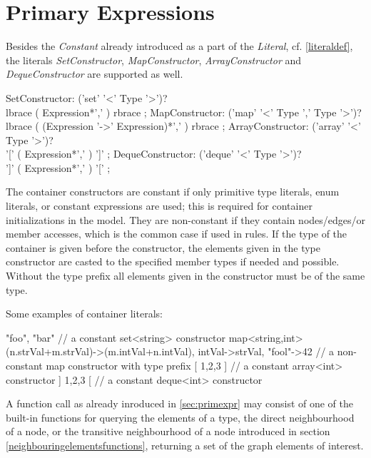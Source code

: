 \section{Primary Expressions}\label{sec:containerprimexpr}

Besides the \emph{Constant} already introduced as a part of the \emph{Literal}, cf. \ref{literaldef}, the literals \emph{SetConstructor}, \emph{MapConstructor}, \emph{ArrayConstructor} and \emph{DequeConstructor} are supported as well.

\begin{rail}
  SetConstructor: ('set' '<' Type '>')? \\ lbrace ( Expression*',' ) rbrace ;
  MapConstructor: ('map' '<' Type ',' Type '>')? \\ lbrace ( (Expression '->' Expression)*',' ) rbrace ;
  ArrayConstructor: ('array' '<' Type '>')? \\ '[' ( Expression*',' ) ']' ;
  DequeConstructor: ('deque' '<' Type '>')? \\ ']' ( Expression*',' ) '[' ;
\end{rail}

The container constructors are constant if only primitive type literals, enum literals, or constant expressions are used; this is required for container initializations in the model.
They are non-constant if they contain nodes/edges/or member accesses, which is the common case if used in rules.
If the type of the container is given before the constructor, the elements given in the type constructor are casted to the specified member types if needed and possible.
Without the type prefix all elements given in the constructor must be of the same type.

\begin{example}
Some examples of container literals:
\begin{grgen}
{ "foo", "bar" } // a constant set<string> constructor
map<string,int>{ (n.strVal+m.strVal)->(m.intVal+n.intVal), intVal->strVal, "fool"->42 } // a non-constant map constructor with type prefix
[ 1,2,3 ] // a constant array<int> constructor
] 1,2,3 [ // a constant deque<int> constructor
\end{grgen}
\end{example}

A function call as already inroduced in \ref{sec:primexpr} may consist of one of the built-in functions for querying the elements of a type, the direct neighbourhood of a node, or the transitive neighbourhood of a node introduced in section \ref{neighbouringelementsfunctions}, returning a set of the graph elements of interest.

